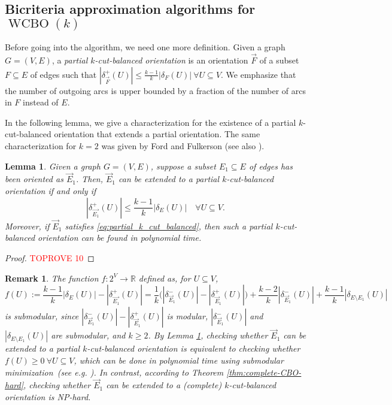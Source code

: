\documentclass[11pt]{article}
\newtheorem{lemma}[theorem]{Lemma}
\newtheorem{remark}{Remark}
\newcommand{\R}{\mathbb{R}}
\begin{document}
\subsection{Bicriteria approximation algorithms for $\operatorname{WCBO}(k)$}\label{sec:WCBO-approx}
Before going into the algorithm, we need one more definition. Given a graph $G=(V,E)$, a \emph{partial $k$-cut-balanced orientation} is an orientation $\vec{F}$ of a subset $F\subseteq E$ of edges such that $|\delta_{\vec{F}}^+(U)|\leq \frac{k-1}{k}|\delta_{F}(U)|\ \forall U\subseteq V$. We emphasize that the number of outgoing arcs is upper bounded by a fraction of the number of arcs in $F$ instead of $E$.


In the following lemma, we give a characterization for the existence of a partial $k$-cut-balanced orientation that extends a partial orientation. The same characterization for $k=2$ was given by Ford and Fulkerson \cite{ford2015flows} (see also \cite{kappauf1979mixed}).
\begin{lemma}\label{lemma:complete_k-balanced}
     Given a graph $G=(V,E)$, suppose a subset $E_1\subseteq E$ of edges  has been oriented as $\vec{E}_1$. Then, $\vec{E}_1$ can be extended to a partial $k$-cut-balanced orientation if and only if 
\begin{equation}\label{eq:partial_k_cut_balanced}
         |\delta_{\vec{E_1}}^+(U)|\leq \frac{k-1}{k}|\delta_E(U)|\quad \forall U\subseteq V.
     \end{equation}
     Moreover, if $\vec{E}_1$ satisfies \eqref{eq:partial_k_cut_balanced}, then such a partial $k$-cut-balanced orientation can be found in polynomial time.
\end{lemma}
\begin{proof}\textcolor{red}{TOPROVE 10}\end{proof}

\begin{remark}
The function $f:2^V\rightarrow \R$ defined as, for $U\subseteq V$,
    \[
         f(U):=\frac{k-1}{k}|\delta_E(U)|-|\delta_{\vec{E_1}}^+(U)|=\frac{1}{k}\Big(|\delta_{\vec{E}_1}^-(U)|-|\delta_{\vec{E}_1}^+(U)|\Big)+\frac{k-2}{k}|\delta_{\vec{E}_1}^-(U)|+\frac{k-1}{k}|\delta_{E\setminus E_1}(U)|
     \]
     is submodular, since $|\delta_{\vec{E}_1}^-(U)|-|\delta_{\vec{E}_1}^+(U)|$ is modular, $|\delta_{\vec{E}_1}^-(U)|$ and $|\delta_{E\setminus E_1}(U)|$ are submodular, and $k\geq 2$. By Lemma \ref{lemma:complete_k-balanced}, checking whether $\vec{E}_1$ can be extended to a partial $k$-cut-balanced orientation is equivalent to checking whether $f(U)\geq 0\ \forall U\subseteq V$, which can be done in polynomial time using submodular minimization~(see e.g. \cite{schrijver2000combinatorial,grotschel1981ellipsoid,iwata2001combinatorial}). In contrast, according to Theorem \ref{thm:complete-CBO-hard}, checking whether $\vec{E}_1$ can be extended to a (complete) $k$-cut-balanced orientation is NP-hard.
\end{remark} 
\end{document}
